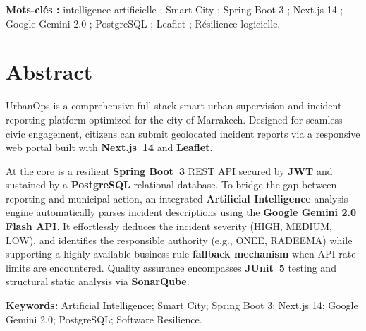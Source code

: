 \documentclass[12pt,a4paper,oneside]{book} %
\begin{document}
\vspace{0.9cm}
\begin{center}
\textbf{Mots-clés :} intelligence artificielle ; Smart City ; Spring Boot 3 ; Next.js 14 ; Google Gemini 2.0 ; PostgreSQL ; Leaflet ; Résilience logicielle.
\end{center}

\clearpage

\chapter*{Abstract}
\thispagestyle{plain}
\begin{center}
\begin{minipage}{0.88\textwidth}
\justifying
\begin{itshape}
UrbanOps is a comprehensive full-stack smart urban supervision and incident reporting platform optimized for the city of Marrakech. Designed for seamless civic engagement, citizens can submit geolocated incident reports via a responsive web portal built with \textbf{Next.js~14} and \textbf{Leaflet}. 

At the core is a resilient \textbf{Spring Boot~3} REST API secured by \textbf{JWT} and sustained by a \textbf{PostgreSQL} relational database. To bridge the gap between reporting and municipal action, an integrated \textbf{Artificial Intelligence} analysis engine automatically parses incident descriptions using the \textbf{Google Gemini 2.0 Flash API}. It effortlessly deduces the incident severity (HIGH, MEDIUM, LOW), and identifies the responsible authority (e.g., ONEE, RADEEMA) while supporting a highly available business rule \textbf{fallback mechanism} when API rate limits are encountered. Quality assurance encompasses \textbf{JUnit~5} testing and structural static analysis via \textbf{SonarQube}.
\end{itshape}
\end{minipage}
\end{center}

\vspace{0.9cm}
\begin{center}
\textbf{Keywords:} Artificial Intelligence; Smart City; Spring Boot 3; Next.js 14; Google Gemini 2.0; PostgreSQL; Software Resilience.
\end{center}

\clearpage

\end{document}
